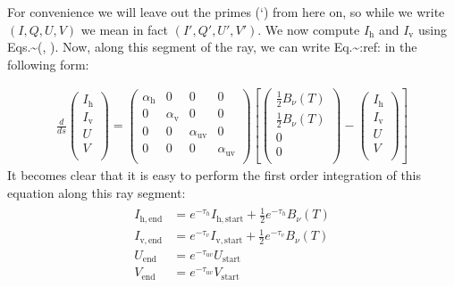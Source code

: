 \documentclass[letterpaper,10pt,english]{sphinxmanual}
\begin{document}
For convenience we will leave out the primes (‘) from here on, so while we write
\((I,Q,U,V)\) we mean in fact \((I',Q',U',V')\). We now compute
\(I_{\mathrm{h}}\) and \(I_{\mathrm{v}}\) using
Eqs.\textasciitilde{}(, ). Now, along this
segment of the ray, we can write
Eq.\textasciitilde{}:ref: in the following form:

\label{\detokenize{dustradtrans:eq-firstorder-int-emisabs}}\begin{equation*}
\begin{split}\frac{d}{ds}
\left(\begin{matrix}
I_{\mathrm{h}} \\
I_{\mathrm{v}} \\
U \\
V \\
\end{matrix}\right)
=
\left(\begin{matrix}
\alpha_{\mathrm{h}} & 0 & 0 & 0 \\
0 & \alpha_{\mathrm{v}} & 0 & 0  \\
0 & 0 & \alpha_{\mathrm{uv}} & 0 \\
0 & 0 & 0 & \alpha_{\mathrm{uv}} \\
\end{matrix}\right)
\left[
\left(\begin{matrix}
\tfrac{1}{2} B_\nu(T) \\
\tfrac{1}{2} B_\nu(T) \\
0 \\
0 \\
\end{matrix}\right)
-
\left(\begin{matrix}
I_{\mathrm{h}} \\
I_{\mathrm{v}} \\
U \\
V \\
\end{matrix}\right)\right]\end{split}
\end{equation*}
It becomes clear that it is easy to perform the first order integration of this
equation along this ray segment:
\begin{equation*}
\begin{split}\begin{split}
I_{\mathrm{h,end}} &=  e^{-\tau_h}I_{\mathrm{h,start}} + \tfrac{1}{2}e^{-\tau_h}B_\nu(T)\\
I_{\mathrm{v,end}} &=  e^{-\tau_v}I_{\mathrm{v,start}} + \tfrac{1}{2}e^{-\tau_v}B_\nu(T) \\
U_{\mathrm{end}} &=    e^{-\tau_{uv}}U_{\mathrm{start}}\\
V_{\mathrm{end}} &=    e^{-\tau_{uv}}V_{\mathrm{start}}
\end{split}\end{split}
\end{equation*}
\end{document}
